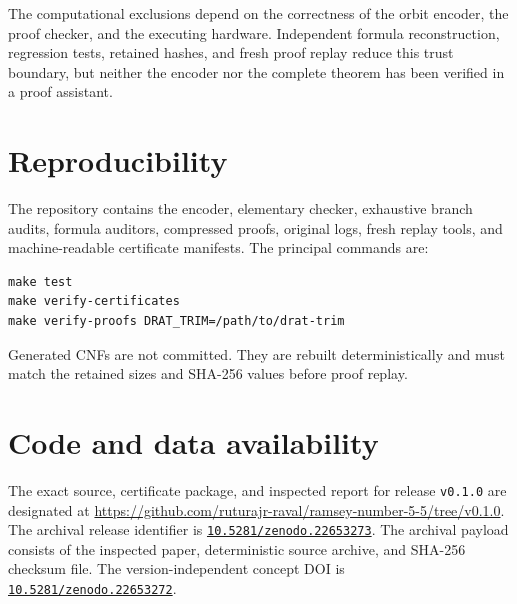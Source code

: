 \documentclass[11pt]{article}
\begin{document}
The computational exclusions depend on the correctness of the orbit encoder,
the proof checker, and the executing hardware. Independent formula
reconstruction, regression tests, retained hashes, and fresh proof replay
reduce this trust boundary, but neither the encoder nor the complete theorem
has been verified in a proof assistant.

\section{Reproducibility}

The repository contains the encoder, elementary checker, exhaustive branch
audits, formula auditors, compressed proofs, original logs, fresh replay
tools, and machine-readable certificate manifests. The principal commands
are:
\begin{verbatim}
make test
make verify-certificates
make verify-proofs DRAT_TRIM=/path/to/drat-trim
\end{verbatim}

Generated CNFs are not committed. They are rebuilt deterministically and
must match the retained sizes and SHA-256 values before proof replay.

\small
\raggedright

\section{Code and data availability}

The exact source, certificate package, and inspected report for release
\texttt{v0.1.0} are designated at
\url{https://github.com/ruturajr-raval/ramsey-number-5-5/tree/v0.1.0}.
The archival release identifier is
\href{https://doi.org/10.5281/zenodo.22653273}
{\texttt{10.5281/zenodo.22653273}}. The archival payload consists of the
inspected paper, deterministic source archive, and SHA-256 checksum file. The
version-independent concept DOI is
\href{https://doi.org/10.5281/zenodo.22653272}
{\texttt{10.5281/zenodo.22653272}}.
\end{document}
